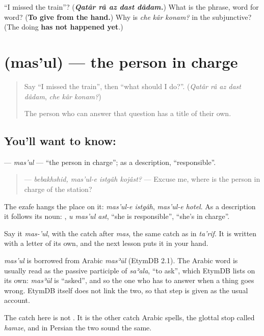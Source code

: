 \begin{tcolorbox}[breakable,colback=teal!4,colframe=teal!35!black,title={Before you move on}]
\textquotedblleft{}I missed the train\textquotedblright{}? (\emph{\textbf{Qatâr râ az dast dâdam.}}) What is the phrase, word for word? (\textbf{To give from the hand.}) Why is \emph{che kâr konam?} in the subjunctive? (The doing \textbf{has not happened yet}.)
\end{tcolorbox}
\section[\texorpdfstring{\fa{مسئول} (mas'ul)}{مسئول (mas'ul)}]{ (mas'ul) — the person in charge}

\label{lesson:FA-C295-masul}



\begin{quote}
Say \textquotedblleft{}I missed the train\textquotedblright{}, then \textquotedblleft{}what should I do?\textquotedblright{}. (\emph{Qatâr râ az dast dâdam}, \emph{che kâr konam?})

The person who can answer that question has a title of their own.
\end{quote}

\subsection*{You'll want to know: }
\textbf{} — \emph{mas'ul} — \textquotedblleft{}the person in charge\textquotedblright{}; as a description, \textquotedblleft{}responsible\textquotedblright{}.

\begin{quote}
\textbf{   } — \emph{bebakhshid, mas'ul-e istgâh kojâst?} — Excuse me, where is the person in charge of the station?
\end{quote}

The ezafe hangs the place on it: \emph{mas'ul-e istgâh}, \emph{mas'ul-e hotel}. As a description it follows its noun: \textbf{  }, \emph{u mas'ul ast}, \textquotedblleft{}she is responsible\textquotedblright{}, \textquotedblleft{}she's in charge\textquotedblright{}.

Say it \emph{mas-'ul}, with the catch after \emph{mas}, the same catch as in \emph{ta'rif}. It is written with a letter of its own, and the next lesson puts it in your hand.

\begin{cousinweb}
\emph{mas'ul} is borrowed from Arabic \emph{masʾūl} (EtymDB 2.1). The Arabic word is usually read as the passive participle of \emph{saʾala}, \textquotedblleft{}to ask\textquotedblright{}, which EtymDB lists on its own: \emph{masʾūl} is \textquotedblleft{}asked\textquotedblright{}, and so the one who has to answer when a thing goes wrong. EtymDB itself does not link the two, so that step is given as the usual account.

The catch here is not \textbf{}. It is the other catch Arabic spells, the glottal stop called \emph{hamze}, and in Persian the two sound the same.
\end{cousinweb}

